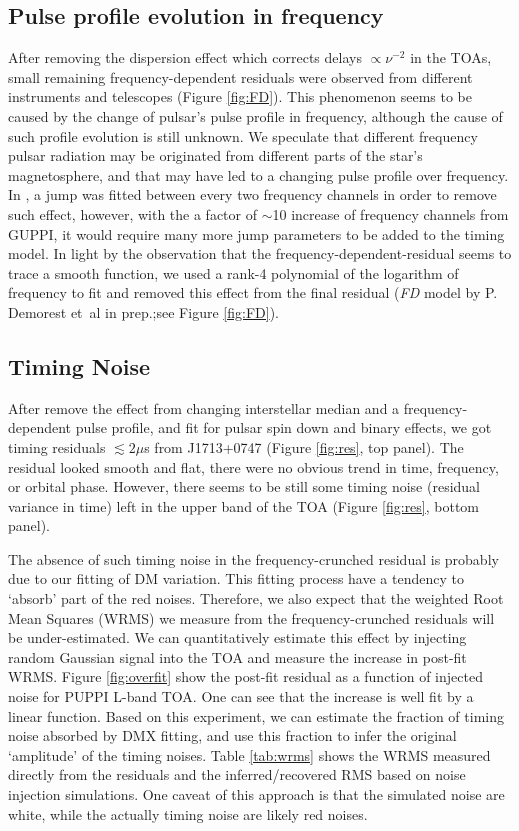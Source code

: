\subsection{Pulse profile evolution in frequency}
\label{sec:FD}
After removing the dispersion effect which corrects delays $\propto \nu^{-2}$
in the TOAs, small remaining frequency-dependent residuals were observed from
different instruments and telescopes (Figure \ref{fig:FD}).  
This phenomenon seems to be caused by the change of pulsar's pulse profile in
frequency, although the cause of such profile evolution is still unknown.
We speculate that different frequency pulsar radiation may be originated from
different parts of the star's magnetosphere, and that may have led to a
changing pulse profile over frequency.
In \citet{sns+05}, a jump was fitted between every two frequency channels in order to remove such effect, however, with the a factor of $\sim$10 increase of frequency channels from GUPPI, it would require many more jump parameters to be added to the timing model.
In light by the observation that the frequency-dependent-residual seems to
trace a smooth function, we used a rank-4 polynomial of the logarithm of
frequency to fit and removed this effect from the final residual ({\it FD}
model by P. Demorest et~al in prep.;see Figure \ref{fig:FD}). 



\subsection{Timing Noise}
After remove the effect from changing interstellar median and a
frequency-dependent pulse profile, and fit for pulsar spin down and binary
effects, we got timing residuals $\lesssim 2\mu$s from J1713+0747 (Figure
\ref{fig:res}, top panel).
The residual looked smooth and flat, there were no obvious trend in time,
frequency, or orbital phase.
However, there seems to be still some timing noise (residual variance in time)
left in the upper band of the TOA (Figure \ref{fig:res}, bottom panel).

The absence of such timing noise in the frequency-crunched residual is probably due to
our fitting of DM variation. 
This fitting process have a tendency to `absorb' part of the red noises.
Therefore, we also expect that the weighted Root Mean Squares (WRMS) we measure from the
frequency-crunched residuals will be under-estimated. We can quantitatively
estimate this effect by injecting random Gaussian signal into the TOA and
measure the increase in post-fit WRMS. Figure \ref{fig:overfit} show
the post-fit residual as a function of injected noise for PUPPI L-band TOA. 
One can see that the increase is well fit by a linear function. 
Based on this experiment, we
can estimate the fraction of timing noise absorbed by DMX fitting, and use
this fraction to infer the original `amplitude' of the timing noises. 
Table \ref{tab:wrms} shows the WRMS measured directly from the
residuals and 
the inferred/recovered RMS based on noise injection simulations. One caveat of this
approach is that the simulated noise are white, while the actually timing
noise are likely red noises. 

